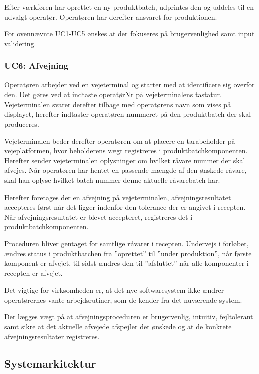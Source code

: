 \documentclass[a4paper]{article}
\begin{document}
Efter værkføren har oprettet en ny produktbatch, udprintes den og uddeles til en udvalgt operatør. Operatøren har derefter ansvaret for produktionen. 

For ovennævnte UC1-UC5 ønskes at der fokuseres på brugervenlighed samt input validering.


\subsubsection{UC6: Afvejning} %

Operatøren arbejder ved en vejeterminal og starter med at identificere sig overfor den. Det gøres ved at indtaste operatørNr på vejeterminalens tastatur. Vejeterminalen svarer derefter tilbage med operatørens navn som vises på displayet, herefter indtaster operatøren nummeret på den produktbatch der skal produceres.

Vejeterminalen beder derefter operatøren om at placere en tarabeholder på vejeplatformen, hvor beholderens vægt registreres i produktbatchkomponenten. Herefter sender vejeterminalen oplysninger om hvilket råvare nummer der skal afvejes. Når operatøren har hentet en passende mængde af den ønskede råvare, skal han oplyse hvilket batch nummer denne aktuelle råvarebatch har.

Herefter foretages der en afvejning på vejeterminalen, afvejningsresultatet accepteres først når det ligger indenfor den tolerance der er angivet i recepten. Når afvejningsresultatet er blevet accepteret, registreres det i produktbatchkomponenten. 

Proceduren bliver gentaget for samtlige råvarer i recepten. Undervejs i forløbet, ændres status i produktbatchen fra ”oprettet” til ”under produktion”, når første komponent er afvejet, til sidst ændres den til ”afsluttet” når alle komponenter i recepten er afvejet.

Det vigtige for virksomheden er, at det nye softwaresystem ikke ændrer operatørernes vante arbejdsrutiner, som de kender fra det nuværende system.

Der lægges vægt på at afvejningsproceduren er brugervenlig, intuitiv, fejltolerant samt sikre at det aktuelle afvejede afspejler det ønskede og at de konkrete afvejningsresultater registreres.



\subsection{Systemarkitektur} %
\end{document}
